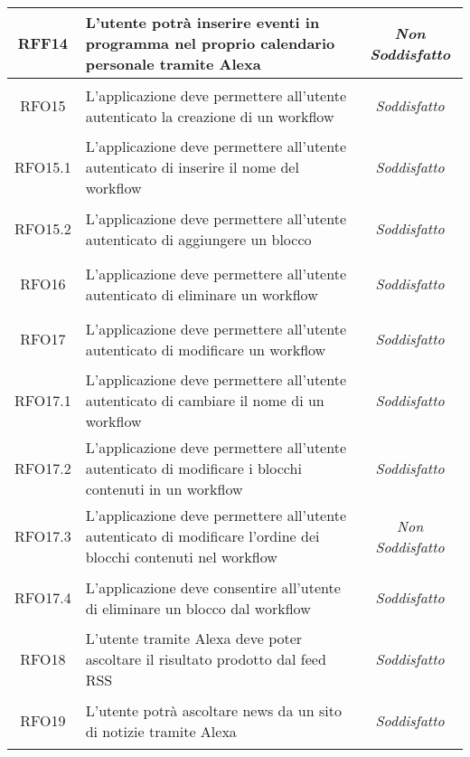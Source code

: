 \begin{longtable}{|c|>{\centering}m{7cm}|c|}
	\hypertarget{RFF14}{RFF14} & L'utente potrà inserire eventi in programma nel proprio calendario personale tramite Alexa & \textit{Non Soddisfatto}\\ \hline
	
	\hypertarget{RFO15}{RFO15} & L'applicazione deve permettere all'utente autenticato la creazione di un workflow & \textit{Soddisfatto}\\ \hline
	
	\hypertarget{RFO15.1}{RFO15.1} & L'applicazione deve permettere all'utente autenticato di inserire il nome del workflow & \textit{Soddisfatto}\\ \hline
	
	\hypertarget{RFO15.2}{RFO15.2} & L'applicazione deve permettere all'utente autenticato di aggiungere un blocco & \textit{Soddisfatto}\\ \hline
	
	\hypertarget{RFO16}{RFO16} & L'applicazione deve permettere all'utente autenticato di eliminare un workflow & \textit{Soddisfatto}\\ \hline
	
	\hypertarget{RFO17}{RFO17} & L'applicazione deve permettere all'utente autenticato di modificare un workflow & \textit{Soddisfatto}\\ \hline
	
	\hypertarget{RFO17.1}{RFO17.1} & L'applicazione deve permettere all'utente autenticato di cambiare il nome di un workflow & \textit{Soddisfatto}\\ \hline
	
	\hypertarget{RFO17.2}{RFO17.2} & L'applicazione deve permettere all'utente autenticato di modificare i blocchi contenuti in un workflow & \textit{Soddisfatto}\\ \hline
	
	\hypertarget{RFO17.3}{RFO17.3} & L'applicazione deve permettere all'utente autenticato di modificare l'ordine dei blocchi contenuti nel workflow & \textit{Non Soddisfatto}\\ \hline
	
	\hypertarget{RFO17.4}{RFO17.4} & L'applicazione deve consentire all'utente di eliminare un blocco dal workflow & \textit{Soddisfatto}\\ \hline
	
	\hypertarget{RFO18}{RFO18} & L'utente tramite Alexa deve poter ascoltare il risultato prodotto dal feed RSS & \textit{Soddisfatto}\\ \hline
	
	\hypertarget{RFO19}{RFO19} & L'utente potrà ascoltare news da un sito di notizie tramite Alexa & \textit{Soddisfatto}\\ \hline
	

\end{longtable}
